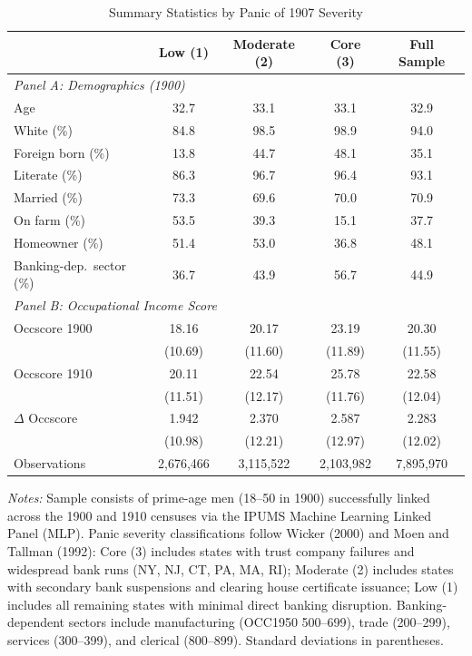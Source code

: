 \begin{table}[H]
\centering
\caption{Summary Statistics by Panic of 1907 Severity}
\begin{threeparttable}
\begin{tabular}{l cccc}
\toprule
 & Low (1) & Moderate (2) & Core (3) & Full Sample \\
\midrule
\multicolumn{5}{l}{\textit{Panel A: Demographics (1900)}} \\
Age & 32.7 & 33.1 & 33.1 & 32.9 \\
White (\%) & 84.8 & 98.5 & 98.9 & 94.0 \\
Foreign born (\%) & 13.8 & 44.7 & 48.1 & 35.1 \\
Literate (\%) & 86.3 & 96.7 & 96.4 & 93.1 \\
Married (\%) & 73.3 & 69.6 & 70.0 & 70.9 \\
On farm (\%) & 53.5 & 39.3 & 15.1 & 37.7 \\
Homeowner (\%) & 51.4 & 53.0 & 36.8 & 48.1 \\
Banking-dep.\ sector (\%) & 36.7 & 43.9 & 56.7 & 44.9 \\
\midrule
\multicolumn{5}{l}{\textit{Panel B: Occupational Income Score}} \\
Occscore 1900 & 18.16 & 20.17 & 23.19 & 20.30 \\
 & (10.69) & (11.60) & (11.89) & (11.55) \\
Occscore 1910 & 20.11 & 22.54 & 25.78 & 22.58 \\
 & (11.51) & (12.17) & (11.76) & (12.04) \\
$\Delta$ Occscore & 1.942 & 2.370 & 2.587 & 2.283 \\
 & (10.98) & (12.21) & (12.97) & (12.02) \\
\midrule
Observations & 2,676,466 & 3,115,522 & 2,103,982 & 7,895,970 \\
\bottomrule
\end{tabular}
\begin{tablenotes}[flushleft]
\small
\item \textit{Notes:} Sample consists of prime-age men (18--50 in 1900) successfully linked across the 1900 and 1910 censuses via the IPUMS Machine Learning Linked Panel (MLP). Panic severity classifications follow Wicker (2000) and Moen and Tallman (1992): Core (3) includes states with trust company failures and widespread bank runs (NY, NJ, CT, PA, MA, RI); Moderate (2) includes states with secondary bank suspensions and clearing house certificate issuance; Low (1) includes all remaining states with minimal direct banking disruption. Banking-dependent sectors include manufacturing (OCC1950 500--699), trade (200--299), services (300--399), and clerical (800--899). Standard deviations in parentheses.
\end{tablenotes}
\end{threeparttable}
\label{tab:summary}
\end{table}

